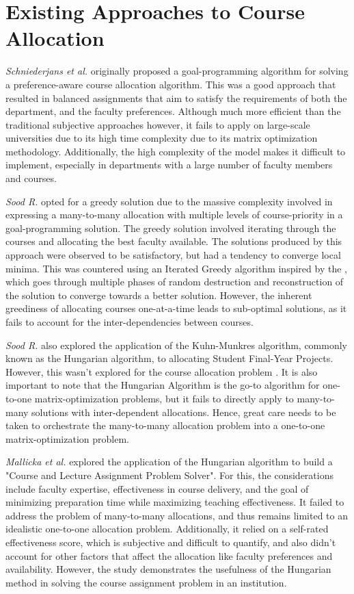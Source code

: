 \section{Existing Approaches to Course Allocation}

\textit{Schniederjans et al.} \cite{schniederjans1987goal} originally proposed a goal-programming algorithm for solving a preference-aware course allocation algorithm. This was a good approach that resulted in balanced assignments that aim to satisfy the requirements of both the department, and the faculty preferences. Although much more efficient than the traditional subjective approaches however, it fails to apply on large-scale universities due to its high time complexity due to its matrix optimization methodology. Additionally, the high complexity of the model makes it difficult to implement, especially in departments with a large number of faculty members and courses.

\textit{Sood R.} \cite{rohan2017} opted for a greedy solution due to the massive complexity involved in expressing a many-to-many allocation with multiple levels of course-priority in a goal-programming solution. The greedy solution involved iterating through the courses and allocating the best faculty available. The solutions produced by this approach were observed to be satisfactory, but had a tendency to converge local minima. This was countered using an Iterated Greedy algorithm inspired by the \cite{ruiz2007simple}, which goes through multiple phases of random destruction and reconstruction of the solution to converge towards a better solution. However, the inherent greediness of allocating courses one-at-a-time leads to sub-optimal solutions, as it fails to account for the inter-dependencies between courses.

\textit{Sood R.} also explored the application of the Kuhn-Munkres algorithm, commonly known as the Hungarian algorithm, to allocating Student Final-Year Projects. However, this wasn't explored for the course allocation problem \cite{rohan2017}. It is also important to note that the Hungarian Algorithm \cite{munkres1957algorithms} is the go-to algorithm for one-to-one matrix-optimization problems, but it fails to directly apply to many-to-many solutions with inter-dependent allocations. Hence, great care needs to be taken to orchestrate the many-to-many allocation problem into a one-to-one matrix-optimization problem.

\textit{Mallicka et al.} \cite{mallicka2021claps} explored the application of the Hungarian algorithm to build a "Course and Lecture Assignment Problem Solver". For this, the considerations include faculty expertise, effectiveness in course delivery, and the goal of minimizing preparation time while maximizing teaching effectiveness. It failed to address the problem of many-to-many allocations, and thus remains limited to an idealistic one-to-one allocation problem. Additionally, it relied on a self-rated effectiveness score, which is subjective and difficult to quantify, and also didn't account for other factors that affect the allocation like faculty preferences and availability. However, the study demonstrates the usefulness of the Hungarian method in solving the course assignment problem in an institution.

